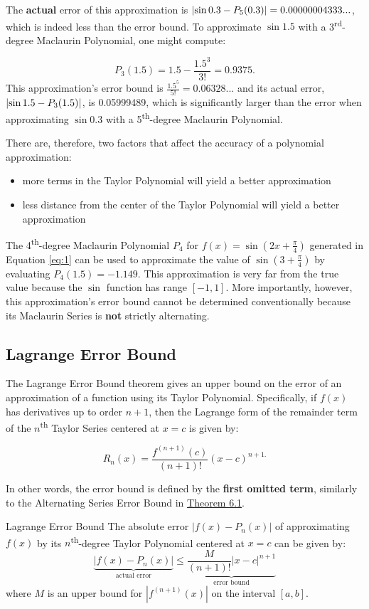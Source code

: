 \documentclass[10pt]{article}
\theoremstyle{definition}
\DeclarePairedDelimiter{\abs}{\lvert}{\rvert}
\begin{document}
The \textbf{actual} error of this approximation is $\abs*{\sin 0.3 - P_5(0.3)}=0.00000004333...$, which is indeed less than the error bound. To approximate $\sin 1.5$ with a 3\textsuperscript{rd}-degree Maclaurin Polynomial, one might compute:

\[P_3(1.5)=1.5-\frac{1.5^3}{3!}=0.9375.\]
This approximation's error bound is $\frac{1.5^5}{5!}=0.06328...$ and its actual error, $\abs*{\sin 1.5 - P_3(1.5)}$, is 0.05999489, which is significantly larger than the error when approximating $\sin 0.3$ with a 5\textsuperscript{th}-degree Maclaurin Polynomial.

\newpage

There are, therefore, two factors that affect the accuracy of a polynomial approximation:
\begin{itemize}
    \item more terms in the Taylor Polynomial will yield a better approximation
    \item less distance from the center of the Taylor Polynomial will yield a better approximation
\end{itemize}

The 4\textsuperscript{th}-degree Maclaurin Polynomial $P_4$ for $f(x)=\sin\left(2x+\frac{\pi}{4}\right)$ generated in Equation \ref{eq:1} can be used to approximate the value of $\sin \left(3+\frac{\pi}{4}\right)$ by evaluating $P_4(1.5)=-1.149$. This approximation is very far from the true value because the $\sin$ function has range $[-1,1]$. More importantly, however, this approximation's error bound cannot be determined conventionally because its Maclaurin Series is \textbf{not} strictly alternating.

\subsection{Lagrange Error Bound}
The Lagrange Error Bound theorem gives an upper bound on the error of an approximation of a function using its Taylor Polynomial. Specifically, if $f(x)$ has derivatives up to order $n+1$, then the Lagrange form of the remainder term of the $n$\textsuperscript{th} Taylor Series centered at $x=c$ is given by:

\[R_n(x) = \frac{f^{(n+1)}(c)}{(n+1)!}(x-c)^{n+1.}\]

In other words, the error bound is defined by the \textbf{first omitted term}, similarly to the Alternating Series Error Bound in \hyperlink{Error Bound}{Theorem 6.1}. 

\begin{theorem}{Lagrange Error Bound}{}
    The absolute error $|f(x) - P_n(x)|$ of approximating $f(x)$ by its $n$\textsuperscript{th}-degree Taylor Polynomial centered at $x=c$ can be given by:
    \[\underbrace{|f(x) - P_n(x)|}_{\text{actual error}} \leq \underbrace{\frac{M}{(n+1)!} |x-c|^{n+1}}_{\text{error bound}}\]
    where $M$ is an upper bound for $|f^{(n+1)}(x)|$ on the interval $[a, b]$.
\end{theorem}
\end{document}
